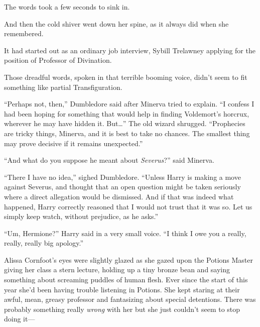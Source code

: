 The words took a few seconds to sink in.

And then the cold shiver went down her spine, as it always did when she remembered.

It had started out as an ordinary job interview, Sybill Trelawney applying for the position of Professor of Divination.


Those dreadful words, spoken in that terrible booming voice, didn’t seem to fit something like partial Transfiguration.

“Perhaps not, then,” Dumbledore said after Minerva tried to explain. “I confess I had been hoping for something that would help in finding Voldemort’s horcrux, wherever he may have hidden it. But…” The old wizard shrugged. “Prophecies are tricky things, Minerva, and it is best to take no chances. The smallest thing may prove decisive if it remains unexpected.”

“And what do you suppose he meant about \emph{Severus}?” said Minerva.

“There I have no idea,” sighed Dumbledore. “Unless Harry is making a move against Severus, and thought that an open question might be taken seriously where a direct allegation would be dismissed. And if that was indeed what happened, Harry correctly reasoned that I would not trust that it was so. Let us simply keep watch, without prejudice, as he asks.”


“Um, Hermione?” Harry said in a very small voice. “I think I owe you a really, really, really big apology.”


Alissa Cornfoot’s eyes were slightly glazed as she gazed upon the Potions Master giving her class a stern lecture, holding up a tiny bronze bean and saying something about screaming puddles of human flesh. Ever since the start of this year she’d been having trouble listening in Potions. She kept staring at their awful, mean, greasy professor and fantasizing about special detentions. There was probably something really \emph{wrong} with her but she just couldn’t seem to stop doing it—

